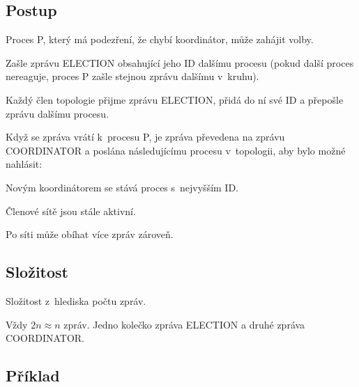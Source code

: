 \subsection{Postup}

\begin{compactitem}
    \item Proces P, který má podezření, že chybí koordinátor, může zahájit volby.
    \begin{compactenum}
        \item Zašle zprávu ELECTION obsahující jeho ID dalšímu procesu (pokud další proces nereaguje, proces P zašle stejnou zprávu dalšímu v~kruhu).
        \item Každý člen topologie přijme zprávu ELECTION, přidá do ní své ID a přepošle zprávu dalšímu procesu.
    \end{compactenum}
    \item Když se zpráva vrátí k~procesu P, je zpráva převedena na zprávu  COORDINATOR a poslána následujícímu procesu v~topologii, aby bylo možné nahlásit:
    \begin{compactenum}
        \item Novým koordinátorem se stává proces s~nejvyšším ID.
        \item Členové sítě jsou stále aktivní.
    \end{compactenum}
    \item Po síti může obíhat více zpráv zároveň.
\end{compactitem}

\subsection{Složitost}

\begin{compactitem}
    \item Složitost z~hlediska počtu zpráv.
    \item Vždy $2n \approx n$ zpráv. Jedno kolečko  zpráva ELECTION a druhé zpráva COORDINATOR.
\end{compactitem}

\subsection{Příklad}

